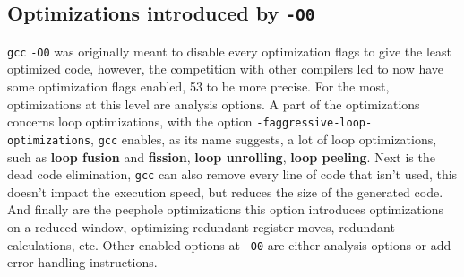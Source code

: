 \documentclass{rapport}
\newcommand{\gcc}{\texttt{gcc} }
\newcommand{\optizero}{\texttt{-O0} }
\begin{document}
\subsection*{Optimizations introduced by \optizero}
\gcc \optizero was originally meant to disable every optimization flags to give the least optimized code, however, the competition with other compilers led to 
now have some optimization flags enabled, 53 to be more precise. For the most, optimizations at this level are analysis options.
\newline\newline
A part of the optimizations concerns loop optimizations, with the option \newline \texttt{-faggressive-loop-optimizations}, \gcc enables, as its name suggests, a lot of loop optimizations, 
such as \textbf{loop fusion} and \textbf{fission}, \textbf{loop unrolling}, \textbf{loop peeling}. \newline
Next is the dead code elimination, \gcc can also remove every line of code that isn't used, this doesn't impact the execution speed, but reduces the size of the generated code.\newline
And finally are the peephole optimizations this option introduces optimizations on a reduced window, optimizing redundant register moves, redundant calculations, etc.
\newline
Other enabled options at \optizero are either analysis options or add error-handling instructions.
\end{document}
